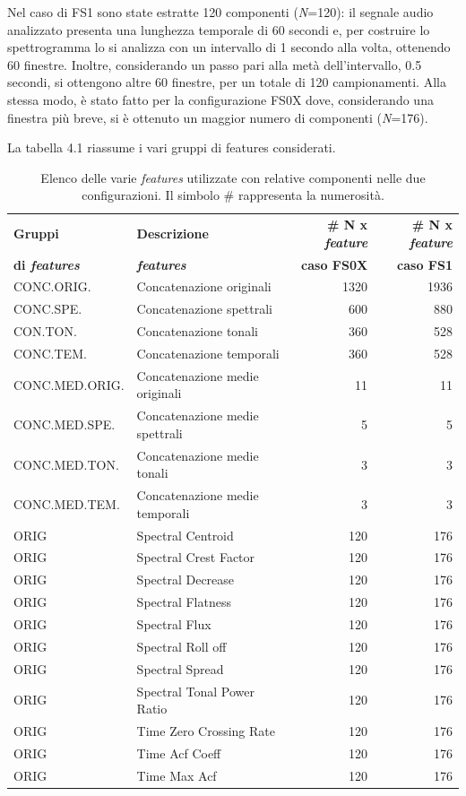Nel caso di FS1 sono state estratte 120 componenti (\textit{N}=120): il segnale audio analizzato
presenta una lunghezza temporale di 60 secondi e, per costruire lo spettrogramma lo si
analizza con un intervallo di 1 secondo alla volta, ottenendo 60 finestre. Inoltre, considerando
un passo pari alla metà dell’intervallo, 0.5 secondi, si ottengono altre 60 finestre, per un totale
di 120 campionamenti. Alla stessa modo, è stato fatto per la configurazione FS0X dove,
considerando una finestra più breve, si è ottenuto un maggior numero di componenti
(\textit{N}=176).

La tabella 4.1 riassume i vari gruppi di features considerati.

\begin{table}[htp] 
	\centering
	\begin{tabular}{llrr}
		\toprule
		\textbf{Gruppi}  
		& \textbf{Descrizione}
		& \textbf{\# N x \textit{feature}}
		& \textbf{\# N x \textit{feature}} \\ 
		\textbf{di \textit{features}}
		&  \textbf{\textit{features}} 
		& \textbf{caso FS0X}
		& \textbf{caso FS1} \\
		\midrule
		CONC.ORIG. & Concatenazione originali & 1320 & 1936 \\
		CONC.SPE. & Concatenazione spettrali & 600 & 880 \\
		CON.TON. & Concatenazione tonali & 360 & 528 \\
		CONC.TEM. & Concatenazione temporali & 360 & 528 \\
		CONC.MED.ORIG. & Concatenazione medie originali & 11 & 11 \\
		CONC.MED.SPE. & Concatenazione medie spettrali & 5 & 5 \\
		CONC.MED.TON. & Concatenazione medie tonali & 3 & 3 \\
		CONC.MED.TEM. & Concatenazione medie temporali & 3 & 3 \\
		ORIG & Spectral Centroid & 120 & 176 \\
		ORIG & Spectral Crest Factor & 120 & 176 \\
		ORIG & Spectral Decrease & 120 & 176 \\
		ORIG & Spectral Flatness & 120 & 176 \\
		ORIG & Spectral Flux & 120 & 176 \\
		ORIG & Spectral Roll off & 120 & 176 \\
		ORIG & Spectral Spread & 120 & 176 \\
		ORIG & Spectral Tonal Power Ratio & 120 & 176 \\
		ORIG & Time Zero Crossing Rate & 120 & 176 \\
		ORIG & Time Acf Coeff & 120 & 176 \\
		ORIG & Time Max Acf & 120 & 176 \\
		\bottomrule		
	\end{tabular}	
	\caption{Elenco delle varie \textit{features} utilizzate con relative componenti nelle due configurazioni. Il simbolo \#
		rappresenta la numerosità.}
\end{table}

